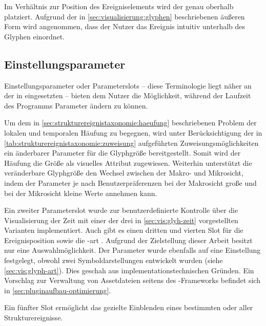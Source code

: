 Im Verhältnis zur Position des Ereigniselements wird der  genau oberhalb platziert. Aufgrund der in \autoref{sec:visualisierung:glyphen} beschriebenen äußeren Form wird angenommen, dass der Nutzer das Ereignis intuitiv unterhalb des Glyphen einordnet.


\subsection*{Einstellungsparameter} 
Einstellungsparameter oder Parameterslots -- diese Terminologie liegt näher an der in  eingesetzten -- bieten dem Nutzer die Möglichkeit, während der Laufzeit des Programms Parameter ändern zu können.

Um dem in \autoref{sec:strukturereignistaxonomie:haeufung} beschriebenen Problem der lokalen und temporalen Häufung zu begegnen, wird unter Berücksichtigung der in \autoref{tab:strukturereignistaxonomie:zuweisung} aufgeführten Zuweisungsmöglichkeiten ein änderbarer Parameter für die Glyphgröße  bereitgestellt. Somit wird der Häufung die Größe als visuelles Attribut zugewiesen. Weiterhin unterstützt die veränderbare Glyphgröße den Wechsel zwischen der Makro- und Mikrosicht, indem der Parameter je nach Benutzerpräferenzen bei der Makrosicht große und bei der Mikrosicht kleine Werte annehmen kann.

Ein zweiter Parameterslot  wurde zur benutzerdefinierte Kontrolle über die Visualisierung der Zeit mit einer der drei in \autoref{sec:vis:glyh-zeit} vorgestellten Varianten implementiert. Auch gibt es einen dritten und vierten Slot für die Ereignisposition  sowie die -art . Aufgrund der Zielstellung dieser Arbeit besitzt  nur eine Auswahlmöglichkeit. Der Parameter  wurde ebenfalls auf eine Einstellung festgelegt, obwohl zwei Symboldarstellungen entwickelt wurden (siehe \autoref{sec:vis:glyph-art}). Dies geschah aus implementationstechnischen Gründen. Ein Vorschlag zur Verwaltung von Assetdateien seitens des -Frameworks befindet sich in \autoref{sec:pluginaufbau-optimierung}.


Ein fünfter Slot  ermöglicht das gezielte Einblenden eines bestimmten oder aller Strukturereignisse.

